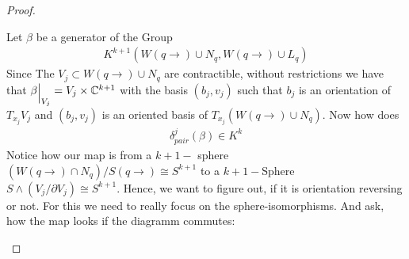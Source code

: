\begin{proof}
\begin{center}
\end{center}


 Let $\beta$ be a generator of the Group 
 \begin{align*}
     K^{k+1}(W(q\to)\cup N_q,W(q\to)\cup L_q)
 \end{align*} Since The $V_j\subset W(q\to)\cup N_q$ are contractible, without restrictions we have that $\beta\einsch{V_j}=V_j\times \C^{k+1}$ with the basis $(b_j,v_j)$ such that $b_j$ is an orientation of $T_{x_j}V_j$ and $(b_j,v_j)$ is an oriented basis of $T_{x_j} (W(q\to)\cup N_q)$. Now how does 
 \begin{align*}
     \delta^j_{pair} (\beta)\in K^{k}
 \end{align*}
Notice how our map is from a $k+1-$ sphere $(W(q\to)\cap N_q)\big/ S(q\to )\cong S^{k+1}$ to a $k+1-$Sphere $S\wedge (V_j\big/ \partial V_j)\cong S^{k+1}$. Hence, we want to figure out, if it is orientation reversing or not. For this we need to really focus on the sphere-isomorphisms. And ask, how the map looks if the diagramm commutes:
\begin{center}
\end{center}
\end{proof}
